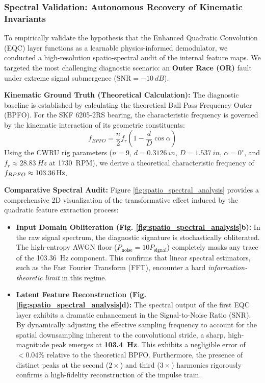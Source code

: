 \documentclass[5p,times,twocolumn]{elsarticle}
\begin{document}
\subsubsection{Spectral Validation: Autonomous Recovery of Kinematic Invariants}
To empirically validate the hypothesis that the Enhanced Quadratic Convolution (EQC) layer functions as a learnable physics-informed demodulator, we conducted a high-resolution spatio-spectral audit of the internal feature maps. We targeted the most challenging diagnostic scenario: an \textbf{Outer Race (OR)} fault under extreme signal submergence ($\text{SNR} = \SI{-10}{dB}$).

\textbf{Kinematic Ground Truth (Theoretical Calculation):}
The diagnostic baseline is established by calculating the theoretical Ball Pass Frequency Outer (BPFO). For the SKF 6205-2RS bearing, the characteristic frequency is governed by the kinematic interaction of its geometric constituents:
\begin{equation}
    f_{BPFO} = \frac{n}{2} f_r \left( 1 - \frac{d}{D} \cos \alpha \right)
\end{equation}
Using the CWRU rig parameters ($n=9$, $d=\SI{0.3126}{in}$, $D=\SI{1.537}{in}$, $\alpha=0^\circ$, and $f_r \approx \SI{28.83}{Hz}$ at \SI{1730}{RPM}), we derive a theoretical characteristic frequency of $f_{BPFO} \approx \textbf{\SI{103.36}{Hz}}$.

\textbf{Comparative Spectral Audit:}
Figure \ref{fig:spatio_spectral_analysis} provides a comprehensive 2D visualization of the transformative effect induced by the quadratic feature extraction process:

\begin{itemize}
    \item \textbf{Input Domain Obliteration (Fig. \ref{fig:spatio_spectral_analysis}b):} In the raw signal spectrum, the diagnostic signature is stochastically obliterated. The high-entropy AWGN floor ($P_{\text{noise}} = 10 P_{\text{signal}}$) completely masks any trace of the \SI{103.36}{Hz} component. This confirms that linear spectral estimators, such as the Fast Fourier Transform (FFT), encounter a hard \textit{information-theoretic limit} in this regime.
    
    \item \textbf{Latent Feature Reconstruction (Fig. \ref{fig:spatio_spectral_analysis}d):} The spectral output of the first EQC layer exhibits a dramatic enhancement in the Signal-to-Noise Ratio (SNR). By dynamically adjusting the effective sampling frequency to account for the spatial downsampling inherent to the convolutional stride, a sharp, high-magnitude peak emerges at \textbf{\SI{103.4}{Hz}}. This exhibits a negligible error of $<0.04\%$ relative to the theoretical BPFO. Furthermore, the presence of distinct peaks at the second ($2\times$) and third ($3\times$) harmonics rigorously confirms a high-fidelity reconstruction of the impulse train.
\end{itemize}
\end{document}
